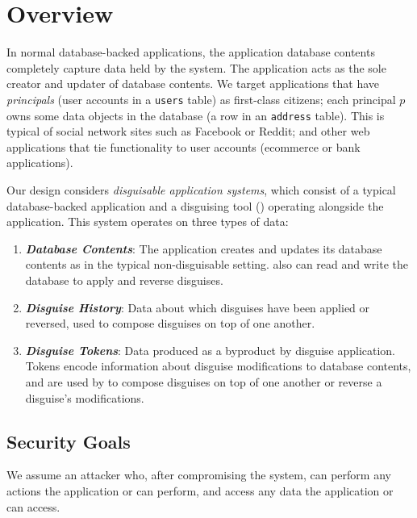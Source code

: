 \section{Overview}
In normal database-backed applications, the application database contents completely capture data
held by the system. The application acts as the sole creator and updater of database contents. We  
target applications that have \emph{principals} (\ie user accounts in a \texttt{users} table) as first-class citizens; each principal $p$ owns some data objects in the database (\eg a row in an \texttt{address} table).
This is typical of social network sites such as Facebook or Reddit; and other web applications that
tie functionality to user accounts (\eg ecommerce or bank applications).

Our design considers \emph{disguisable application systems}, which consist of a typical database-backed
application and a disguising tool (\sys) operating alongside the application. This system operates
on three types of data:
\begin{enumerate}
    \item \emph{\textbf{Database Contents}}: The application creates and updates its database
        contents as in the typical non-disguisable setting. \sys also can read and write
        the database to apply and reverse disguises.
    \item \emph{\textbf{Disguise History}}: Data about which disguises have been applied or
        reversed, used to compose disguises on top of one another.
    \item \emph{\textbf{Disguise Tokens}}: Data produced as a byproduct by disguise application.
        Tokens encode information about disguise modifications to database contents, and are used by
        \sys to compose disguises on top of one another or reverse a disguise's modifications.
\end{enumerate}

\subsection{Security Goals}
We assume an attacker who, after compromising the system, can perform any actions the
application or \sys can perform, and access any data the application or \sys can access.


